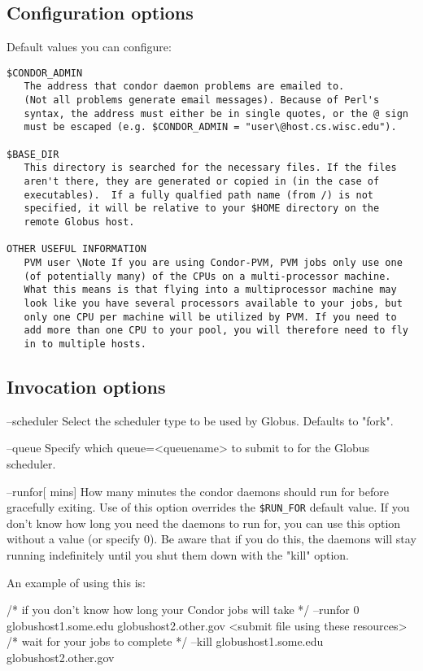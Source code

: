 \subsection{Configuration options}
Default values you can configure:
\begin{verbatim}
$CONDOR_ADMIN
   The address that condor daemon problems are emailed to.
   (Not all problems generate email messages). Because of Perl's
   syntax, the address must either be in single quotes, or the @ sign
   must be escaped (e.g. $CONDOR_ADMIN = "user\@host.cs.wisc.edu").

$BASE_DIR
   This directory is searched for the necessary files. If the files
   aren't there, they are generated or copied in (in the case of
   executables).  If a fully qualfied path name (from /) is not
   specified, it will be relative to your $HOME directory on the
   remote Globus host.

OTHER USEFUL INFORMATION
   PVM user \Note If you are using Condor-PVM, PVM jobs only use one
   (of potentially many) of the CPUs on a multi-processor machine.
   What this means is that flying into a multiprocessor machine may
   look like you have several processors available to your jobs, but
   only one CPU per machine will be utilized by PVM. If you need to
   add more than one CPU to your pool, you will therefore need to fly
   in to multiple hosts.
\end{verbatim}

\subsection{Invocation options}
--scheduler
	Select the scheduler type to be used by Globus. Defaults to "fork".

--queue
	Specify which queue=<queuename> to submit to for the Globus scheduler.

--runfor[ mins]
   How many minutes the condor daemons should run for before gracefully
   exiting. Use of this option overrides the \texttt{\$RUN\_FOR} default value.
   If you don't know how long you need the daemons to run for, you
   can use this option without a value (or specify 0).
   Be aware that if you do this, the daemons will stay running indefinitely
   until you shut them down with the "kill" option.

   An example of using this is:

      /* if you don't know how long your Condor jobs will take */
       --runfor 0 globushost1.some.edu globushost2.other.gov
       <submit file using these resources>
      /* wait for your jobs to complete */
       --kill globushost1.some.edu globushost2.other.gov

